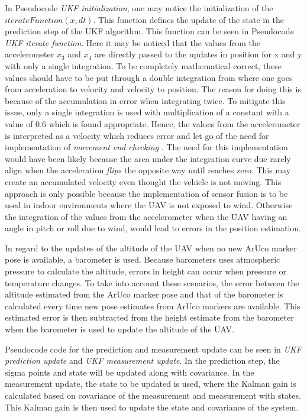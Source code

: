 \documentclass[../Head/report.tex]{subfiles}
\begin{document}
In Pseudocode \textit{UKF initialization}, one may notice the initialization of the $iterateFunction(x,dt)$. This function defines the update of the state in the prediction step of the UKF algorithm. This function can be seen in Pseudocode \textit{UKF iterate function}. Here it may be noticed that the values from the accelerometer $x_3$ and $x_4$ are directly passed to the updates in position for x and y with only a single integration. To be completely mathematical correct, these values should have to be put through a double integration from where one goes from acceleration to velocity and velocity to position. The reason for doing this is because of the accumulation in error when integrating twice. To mitigate this issue, only a single integration is used with multiplication of a constant with a value of 0.6 which is found appropriate. Hence, the values from the accelerometer is interpreted as a velocity which reduces error and let go of the need for implementation of \textit{movement end checking} \cite[p.~6]{ImplementingPositioningAlgorithmsUsingAccelerometers}. The need for this implementation would have been likely because the area under the integration curve due rarely align when the acceleration \textit{flips} the opposite way until reaches zero. This may create an accumulated velocity even thought the vehicle is not moving. This approach is only possible because the implementation of sensor fusion is to be used in indoor environments where the UAV is not exposed to wind. Otherwise the integration of the values from the accelerometer when the UAV having an angle in pitch or roll due to wind, would lead to errors in the position estimation.

In regard to the updates of the altitude of the UAV when no new ArUco marker pose is available, a barometer is used. Because barometers uses atmospheric pressure to calculate the altitude, errors in height can occur when pressure or temperature changes. To take into account these scenarios, the error between the altitude estimated from the ArUco marker pose and that of the barometer is calculated every time new pose estimates from ArUco markers are available. This estimated error is then subtracted from the height estimate from the barometer when the barometer is used to update the altitude of the UAV. 

Pseudocode code for the prediction and measurement update can be seen in \textit{UKF prediction update} and \textit{UKF measurement update}. In the prediction step, the sigma points and state will be updated along with covariance. In the measurement update, the state to be updated is used, where the Kalman gain is calculated based on covariance of the measurement and measurement with states. This Kalman gain is then used to update the state and covariance of the system. 
\end{document}

